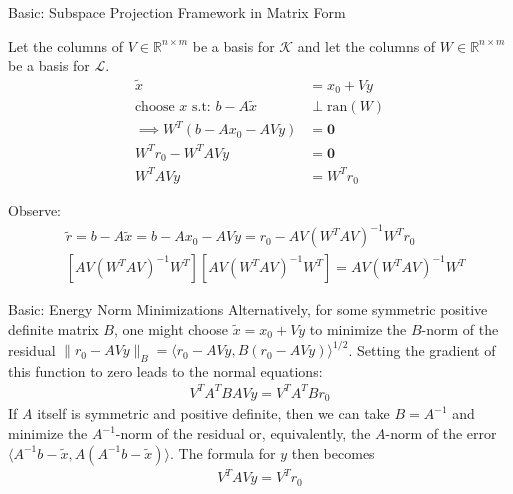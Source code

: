 \documentclass{beamer}
\begin{document}
    \begin{frame}{Basic: Subspace Projection Framework in Matrix Form}
        \begin{definition}
            Let the columns of $V \in \mathbb{R}^{n \times m}$ be a basis for $\mathcal{K}$ and let the columns of $W \in \mathbb{R}^{n \times m}$ be a basis for $\mathcal{L}$. 
            \begin{align}
                \tilde{x} &= x_0 + Vy
                    \\
                    \text{choose } x \text{ s.t: } b - A\tilde{x}  &\perp \text{ran}(W)
                    \\
                    \implies W^T(b - Ax_0 - AVy) &= \mathbf{0}
                    \\
                    W^Tr_0 - W^TAVy&= \mathbf{0}
                    \\
                    W^TAVy &= W^Tr_0
            \end{align}
        \end{definition}
        Observe: 
        \begin{align}
            & \tilde{r} = b - A \tilde{x} = b - A x_0 - AVy = r_0 - AV ( W^T A V )^{-1} W^T r_0
            \\
            & [ A V ( W^T A V )^{-1} W^T ] [ A V ( W^T A V )^{-1} W^T ] = A V ( W^T A V )^{-1} W^T 
        \end{align}
    \end{frame}
    
    \begin{frame}{Basic: Energy Norm Minimizations}
        Alternatively, for some symmetric positive definite matrix $B$, one might choose $\tilde{x} = x_0 + Vy$ to minimize 
            the $B$-norm of the residual $\| r_0 - A V y \|_B = \langle r_0 - A V y , B ( r_0 - A V y ) \rangle^{1/2}$.  Setting the gradient of this function to zero leads to the normal equations:
            \begin{align}
                V^T A^T BAVy = V^T A^T B r_0
            \end{align}
            If $A$ itself is symmetric and positive definite, then we can take $B = A^{-1}$ and minimize the $A^{-1}$-norm of the 
            residual or, equivalently, the $A$-norm of the error $\langle A^{-1} b - \tilde{x} , A ( A^{-1} b - \tilde{x} ) \rangle$.
            The formula for $y$ then becomes
            \begin{align}\label{eqn:Energy_Norm_Minimization_Conditions}
                V^T A V y = V^T r_0
            \end{align}
    \end{frame}
    
\end{document}
